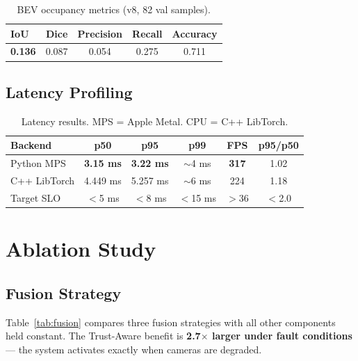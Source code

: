 \documentclass[10pt,twocolumn]{article}
\newcommand{\best}[1]{\textbf{\color{mygreen}#1}}
\begin{document}
\begin{table}[h]
\centering
\caption{BEV occupancy metrics (v8, 82 val samples).}
\label{tab:bev}
\scriptsize
\setlength{\tabcolsep}{5pt}
\begin{tabular}{@{}lcccc@{}}
\toprule
\textbf{IoU} & \textbf{Dice} & \textbf{Precision} &
\textbf{Recall} & \textbf{Accuracy} \\
\midrule
\best{0.136} & 0.087 & 0.054 & 0.275 & 0.711 \\
\bottomrule
\end{tabular}
\end{table}

\subsection{Latency Profiling}

\begin{table}[h]
\centering
\caption{Latency results. MPS = Apple Metal. CPU = C++ LibTorch.}
\label{tab:latency}
\scriptsize
\setlength{\tabcolsep}{4pt}
\begin{tabular}{@{}lccccc@{}}
\toprule
\textbf{Backend} & \textbf{p50} & \textbf{p95} & \textbf{p99} &
\textbf{FPS} & \textbf{p95/p50} \\
\midrule
Python MPS & \best{3.15 ms} & \best{3.22 ms} & $\sim$4 ms & \best{317} & 1.02 \\
C++ LibTorch & 4.449 ms & 5.257 ms & $\sim$6 ms & 224 & 1.18 \\
\midrule
Target SLO & $<$5 ms & $<$8 ms & $<$15 ms & $>$36 & $<$2.0 \\
\bottomrule
\end{tabular}
\end{table}

\section{Ablation Study}
\label{sec:ablation}

\subsection{Fusion Strategy}

Table~\ref{tab:fusion} compares three fusion strategies with all other
components held constant. The Trust-Aware benefit is
\textbf{2.7$\times$ larger under fault conditions} --- the system
activates exactly when cameras are degraded.
\end{document}
